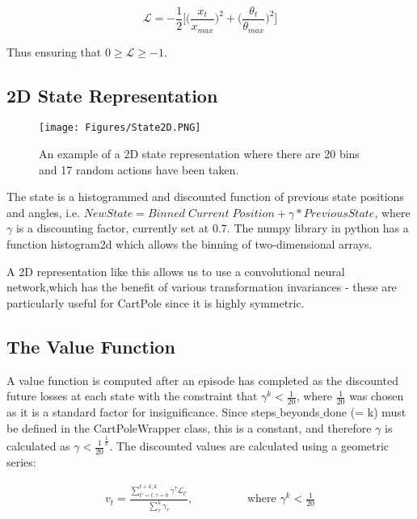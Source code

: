\documentclass[11.7pt]{article}
\newcommand{\loss}{\mathcal{L}}
\begin{document}
\begin{equation}
   \loss = - \frac{1}{2} \bigg[ \Big(\frac{x_t}{x_{max}}\Big)^2 + \Big(\frac{\theta_t}{\theta_{max}}\Big)^2 \bigg]
\end{equation}

Thus ensuring that $0 \geq \loss \geq -1$.

\subsection{2D State Representation}

\begin{wrapfigure}{r}{0.3\textwidth}
   \vspace{-1cm}
   \centering
   \texttt{[image: Figures/State2D.PNG]}
   \caption{An example of a 2D state representation where there are 20 bins and 17 random actions have been taken.}
   \label{fig:state2D}
\end{wrapfigure}

The state is a histogrammed and discounted function of previous state positions and angles, i.e. $New State = Binned \; Current \; Position + \gamma * Previous State$, where $\gamma$ is a discounting factor, currently set at 0.7. The numpy library in python has a function histogram2d which allows the binning of two-dimensional arrays.

A 2D representation like this allows us to use a convolutional neural network,which has the benefit of various transformation invariances - these are particularly useful for CartPole since it is highly symmetric.

\subsection{The Value Function}

A value function is computed after an episode has completed as the discounted future losses at each state with the constraint that $\gamma^{k} < \frac{1}{20}$, where $\frac{1}{20}$ was chosen as it is a standard factor for insignificance. Since steps$\_$beyonds$\_$done (= k) must be defined in the CartPoleWrapper class, this is a constant, and therefore $\gamma$ is calculated as $\gamma < \frac{1}{20}^{\frac{1}{k}}$. The discounted values are calculated using a geometric series:

\begin{align}
   v_t = \frac{\sum_{t'=t, \tau=0}^{t+k, k} \gamma^\tau \loss_{t'} }{\sum_{\tau}^k \gamma_\tau}, \hspace{2cm} \text{where } \gamma^k < \frac{1}{20}
\end{align}
\end{document}
